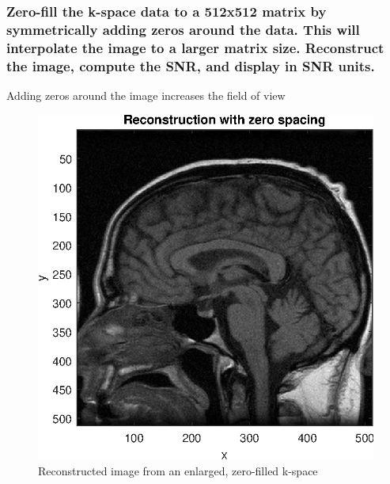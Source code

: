 \subsubsection{Zero-fill the k-space data to a 512x512 matrix by symmetrically adding zeros around
the data. This will interpolate the image to a larger matrix size. Reconstruct the image,
compute the SNR, and display in SNR units.}
Adding zeros around the image increases the field of view

\begin{figure}[h]
    \centering
    \includegraphics[width=.85\linewidth] {./homework4/img/recon_zerofilled.eps}
    \caption{Reconstructed image from an enlarged, zero-filled k-space}
    \label{fig:recon_zero}
    \end{figure} 
    
